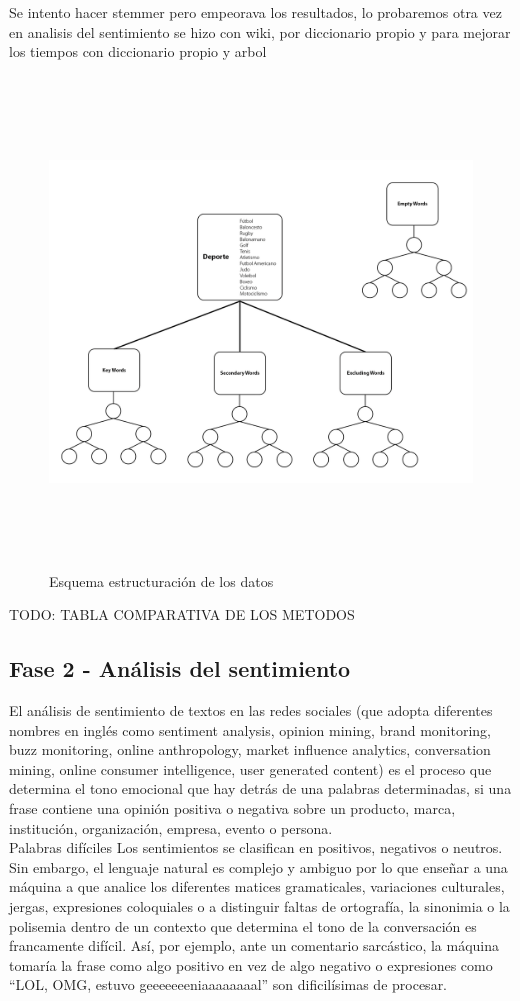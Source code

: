 \documentclass[../all.tex]{subfiles}
\begin{document}
Se intento hacer stemmer pero empeorava los resultados, lo probaremos otra vez en analisis del sentimiento
se hizo con wiki, por  diccionario propio y para mejorar los tiempos con diccionario propio y arbol

\begin{figure}[H]
    \centering
    \includegraphics[height=13cm, width=15cm]{imgs/treeScheme.png}
    \caption{Esquema estructuración de los datos}
\end{figure}

{\color{red} 
    TODO: TABLA COMPARATIVA DE LOS METODOS
}
\newpage
\subsection{Fase 2 - Análisis del sentimiento}
    El análisis de sentimiento de textos en las redes sociales (que adopta diferentes nombres en inglés como sentiment analysis, opinion mining, brand monitoring, buzz monitoring, online anthropology, market influence analytics, conversation mining, online consumer intelligence, user generated content) es el proceso que determina el tono emocional que hay detrás de una palabras determinadas, si una frase contiene una opinión positiva o negativa sobre un producto, marca, institución, organización, empresa, evento o persona.\\
    Palabras difíciles
    Los sentimientos se clasifican en positivos, negativos o neutros. Sin embargo, el lenguaje natural es complejo y ambiguo por lo que enseñar a una máquina a que analice los diferentes matices gramaticales, variaciones culturales, jergas, expresiones coloquiales o a distinguir faltas de ortografía, la sinonimia o la polisemia dentro de un contexto que determina el tono de la conversación es francamente difícil. Así, por ejemplo, ante un comentario sarcástico, la máquina tomaría la frase como algo positivo en vez de algo negativo o expresiones como “LOL, OMG, estuvo geeeeeeeniaaaaaaaal” son dificilísimas de procesar.
\end{document}

